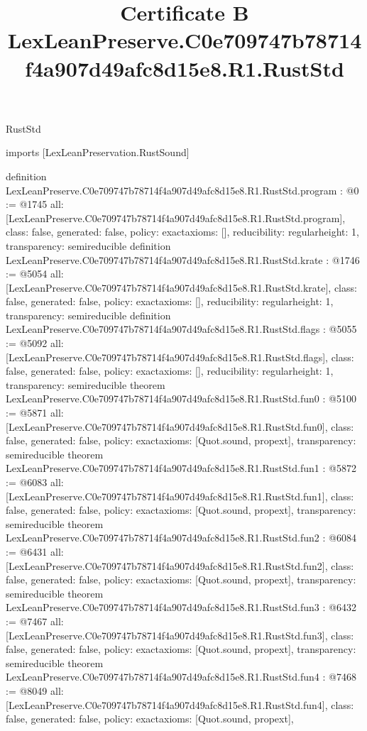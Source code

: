 \begin{lexlean}{RustStd}
\title{Certificate B LexLeanPreserve.C0e709747b78714f4a907d49afc8d15e8.R1.RustStd}
\begin{coremodule}
imports [LexLeanPreservation.RustSound]

definition LexLeanPreserve.C0e709747b78714f4a907d49afc8d15e8.R1.RustStd.program : @0 := @1745 {
  all: [LexLeanPreserve.C0e709747b78714f4a907d49afc8d15e8.R1.RustStd.program],
  class: false,
  generated: false,
  policy: exact{axioms: []},
  reducibility: regular{height: 1},
  transparency: semireducible
}
definition LexLeanPreserve.C0e709747b78714f4a907d49afc8d15e8.R1.RustStd.krate : @1746 := @5054 {
  all: [LexLeanPreserve.C0e709747b78714f4a907d49afc8d15e8.R1.RustStd.krate],
  class: false,
  generated: false,
  policy: exact{axioms: []},
  reducibility: regular{height: 1},
  transparency: semireducible
}
definition LexLeanPreserve.C0e709747b78714f4a907d49afc8d15e8.R1.RustStd.flags : @5055 := @5092 {
  all: [LexLeanPreserve.C0e709747b78714f4a907d49afc8d15e8.R1.RustStd.flags],
  class: false,
  generated: false,
  policy: exact{axioms: []},
  reducibility: regular{height: 1},
  transparency: semireducible
}
theorem LexLeanPreserve.C0e709747b78714f4a907d49afc8d15e8.R1.RustStd.fun0 : @5100 := @5871 {
  all: [LexLeanPreserve.C0e709747b78714f4a907d49afc8d15e8.R1.RustStd.fun0],
  class: false,
  generated: false,
  policy: exact{axioms: [Quot.sound, propext]},
  transparency: semireducible
}
theorem LexLeanPreserve.C0e709747b78714f4a907d49afc8d15e8.R1.RustStd.fun1 : @5872 := @6083 {
  all: [LexLeanPreserve.C0e709747b78714f4a907d49afc8d15e8.R1.RustStd.fun1],
  class: false,
  generated: false,
  policy: exact{axioms: [Quot.sound, propext]},
  transparency: semireducible
}
theorem LexLeanPreserve.C0e709747b78714f4a907d49afc8d15e8.R1.RustStd.fun2 : @6084 := @6431 {
  all: [LexLeanPreserve.C0e709747b78714f4a907d49afc8d15e8.R1.RustStd.fun2],
  class: false,
  generated: false,
  policy: exact{axioms: [Quot.sound, propext]},
  transparency: semireducible
}
theorem LexLeanPreserve.C0e709747b78714f4a907d49afc8d15e8.R1.RustStd.fun3 : @6432 := @7467 {
  all: [LexLeanPreserve.C0e709747b78714f4a907d49afc8d15e8.R1.RustStd.fun3],
  class: false,
  generated: false,
  policy: exact{axioms: [Quot.sound, propext]},
  transparency: semireducible
}
theorem LexLeanPreserve.C0e709747b78714f4a907d49afc8d15e8.R1.RustStd.fun4 : @7468 := @8049 {
  all: [LexLeanPreserve.C0e709747b78714f4a907d49afc8d15e8.R1.RustStd.fun4],
  class: false,
  generated: false,
  policy: exact{axioms: [Quot.sound, propext]},
}
\end{coremodule}
\end{lexlean}
